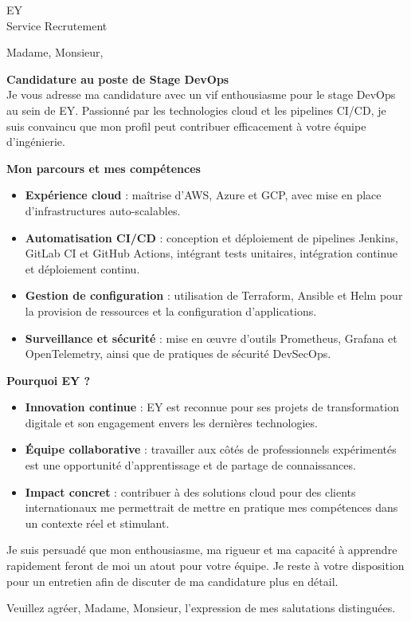 \documentclass[11pt,a4paper]{letter}
\newcommand{\CompanyName}{EY}
\newcommand{\Position}{Stage DevOps}
\begin{document}
\begin{letter}{\CompanyName\\ Service Recrutement}

\opening{Madame, Monsieur,}

\textbf{\large Candidature au poste de \Position} \\[1ex]
Je vous adresse ma candidature avec un vif enthousiasme pour le stage DevOps au sein de \CompanyName. Passionné par les technologies cloud et les pipelines CI/CD, je suis convaincu que mon profil peut contribuer efficacement à votre équipe d'ingénierie.

\medskip
\textbf{Mon parcours et mes compétences}
\begin{itemize}
    \item \textbf{Expérience cloud} : maîtrise d'AWS, Azure et GCP, avec mise en place d'infrastructures auto-scalables.
    \item \textbf{Automatisation CI/CD} : conception et déploiement de pipelines Jenkins, GitLab CI et GitHub Actions, intégrant tests unitaires, intégration continue et déploiement continu.
    \item \textbf{Gestion de configuration} : utilisation de Terraform, Ansible et Helm pour la provision de ressources et la configuration d’applications.
    \item \textbf{Surveillance et sécurité} : mise en œuvre d’outils Prometheus, Grafana et OpenTelemetry, ainsi que de pratiques de sécurité DevSecOps.
\end{itemize}

\medskip
\textbf{Pourquoi EY ?}
\begin{itemize}
    \item \textbf{Innovation continue} : EY est reconnue pour ses projets de transformation digitale et son engagement envers les dernières technologies.
    \item \textbf{Équipe collaborative} : travailler aux côtés de professionnels expérimentés est une opportunité d’apprentissage et de partage de connaissances.
    \item \textbf{Impact concret} : contribuer à des solutions cloud pour des clients internationaux me permettrait de mettre en pratique mes compétences dans un contexte réel et stimulant.
\end{itemize}

\medskip
Je suis persuadé que mon enthousiasme, ma rigueur et ma capacité à apprendre rapidement feront de moi un atout pour votre équipe. Je reste à votre disposition pour un entretien afin de discuter de ma candidature plus en détail.

\closing{Veuillez agréer, Madame, Monsieur, l’expression de mes salutations distinguées.}

\end{letter}
\end{document}
